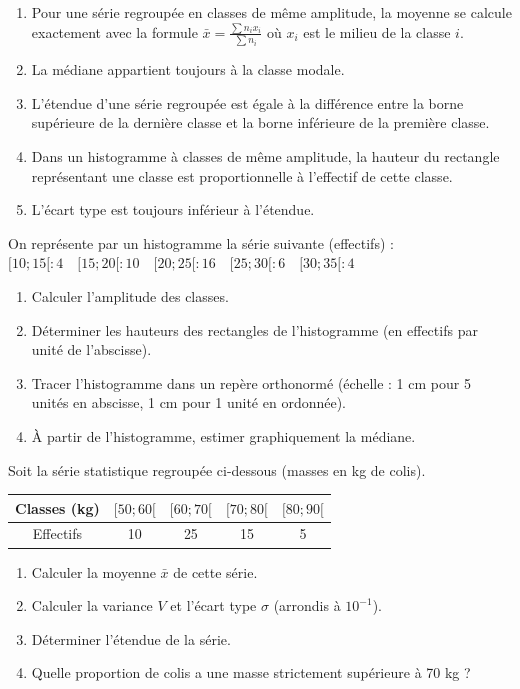 \documentclass[11pt]{article}
\begin{document}
\begin{exercice}
\begin{enumerate}
    \item Pour une série regroupée en classes de même amplitude, la moyenne se calcule exactement avec la formule $\bar{x} = \frac{\sum n_i x_i}{\sum n_i}$ où $x_i$ est le milieu de la classe $i$.
    \item La médiane appartient toujours à la classe modale.
    \item L'étendue d'une série regroupée est égale à la différence entre la borne supérieure de la dernière classe et la borne inférieure de la première classe.
    \item Dans un histogramme à classes de même amplitude, la hauteur du rectangle représentant une classe est proportionnelle à l'effectif de cette classe.
    \item L'écart type est toujours inférieur à l'étendue.
\end{enumerate}
\end{exercice}

\begin{exercice}
On représente par un histogramme la série suivante (effectifs) :\\
$[10 ; 15[ : 4 \quad [15 ; 20[ : 10 \quad [20 ; 25[ : 16 \quad [25 ; 30[ : 6 \quad [30 ; 35[ : 4$
\begin{enumerate}
    \item Calculer l'amplitude des classes.
    \item Déterminer les hauteurs des rectangles de l'histogramme (en effectifs par unité de l'abscisse).
    \item Tracer l'histogramme dans un repère orthonormé (échelle : 1 cm pour 5 unités en abscisse, 1 cm pour 1 unité en ordonnée).
    \item À partir de l'histogramme, estimer graphiquement la médiane.
\end{enumerate}
\end{exercice}

\begin{exercice}
Soit la série statistique regroupée ci-dessous (masses en kg de colis).
\begin{center}
\begin{tabular}{|c|c|c|c|c|}
\hline
Classes (kg) & $[50 ; 60[$ & $[60 ; 70[$ & $[70 ; 80[$ & $[80 ; 90[$ \\
\hline
Effectifs & 10 & 25 & 15 & 5 \\
\hline
\end{tabular}
\end{center}
\begin{enumerate}
    \item Calculer la moyenne $\bar{x}$ de cette série.
    \item Calculer la variance $V$ et l'écart type $\sigma$ (arrondis à $10^{-1}$).
    \item Déterminer l'étendue de la série.
    \item Quelle proportion de colis a une masse strictement supérieure à 70 kg ?
\end{enumerate}
\end{exercice}
\end{document}
